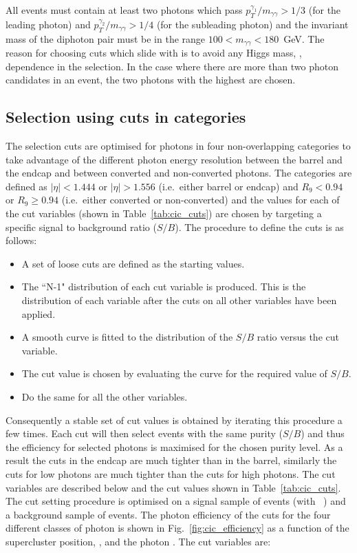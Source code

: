 All events must contain at least two photons which pass $p_{T}^{\gamma_{1}}/m_{\gamma\gamma}>1/3$ (for the leading photon) and $p_{T}^{\gamma_{2}}/m_{\gamma\gamma}>1/4$ (for the subleading photon) and the invariant mass of the diphoton pair must be in the range $100<m_{\gamma\gamma}<180$~GeV. The reason for choosing \pT cuts which slide with \mgg is to avoid any Higgs mass, \mH, dependence in the selection. In the case where there are more than two photon candidates in an event, the two photons with the highest \pT are chosen. 

\subsection{Selection using cuts in categories}
\label{sec:cic}

The selection cuts are optimised for photons in four non-overlapping categories to take advantage of the different photon energy resolution between the barrel and the endcap and between converted and non-converted photons. The categories are defined as $|\eta|<1.444$ or $|\eta|>1.556$ (i.e.\ either barrel or endcap) and $R_{9}<0.94$ or $R_{9}\geq 0.94$ (i.e.\ either converted or non-converted) and the values for each of the cut variables (shown in Table~\ref{tab:cic_cuts}) are chosen by targeting a specific signal to background ratio ($S/B$). The procedure to define the cuts is as follows:

\begin{itemize}
  \item A set of loose cuts are defined as the starting values.
  \item The ``N-1" distribution of each cut variable is produced. This is the distribution of each variable after the cuts on all other variables have been applied.
  \item A smooth curve is fitted to the distribution of the $S/B$ ratio versus the cut variable.
  \item The cut value is chosen by evaluating the curve for the required value of $S/B$.
  \item Do the same for all the other variables.
\end{itemize}

Consequently a stable set of cut values is obtained by iterating this procedure a few times. Each cut will then select events with the same purity ($S/B$) and thus the efficiency for selected photons is maximised for the chosen purity level. As a result the cuts in the endcap are much tighter than in the barrel, similarly the cuts for low \rnine photons are much tighter than the cuts for high \rnine photons. The cut variables are described below and the cut values shown in Table~\ref{tab:cic_cuts}. The cut setting procedure is optimised on a signal sample of \Hgg \MC events (with ~\GeV) and a background sample of \gjet events. The photon efficiency of the cuts for the four different classes of photon is shown in Fig.~\ref{fig:cic_efficiency} as a function of the supercluster position, \eta, and the photon \pT. The cut variables are:

